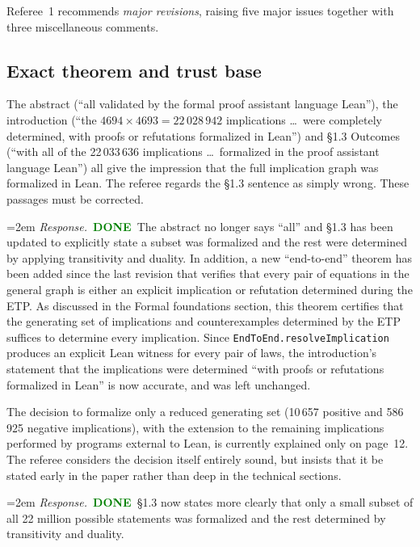 \documentclass[11pt]{amsart}
\newcommand{\done}{\textcolor{green}{\textbf{DONE}}}
\newcommand{\response}[1]{%
  \par\smallskip
  \noindent\hangindent=2em\hangafter=1
  \textit{Response.}\ #1
  \par\smallskip}
\begin{document}
Referee~1 recommends \emph{major revisions}, raising five major issues together with
three miscellaneous comments.

\subsection*{Exact theorem and trust base}

\begin{requests}

\item The abstract (``all validated by the formal proof assistant language Lean''),
the introduction (``the \(4694 \times 4693 = 22\,028\,942\) implications \dots\ were
completely determined, with proofs or refutations formalized in Lean'') and
\S1.3 Outcomes (``with all of the 22\,033\,636 implications \dots\ formalized in the
proof assistant language Lean'') all give the impression that the full implication
graph was formalized in Lean. The referee regards the \S1.3 sentence as simply wrong.
These passages must be corrected.
\response{\done\ The abstract no longer says ``all'' and \S1.3 has been updated to explicitly state a subset was formalized and the rest were determined by applying transitivity and duality.  In addition, a new ``end-to-end'' theorem has been added since the last revision that verifies that every pair of equations in the general graph is either an explicit implication or refutation determined during the ETP.  As discussed in the Formal foundations section, this theorem certifies that the generating set of implications and counterexamples determined by the ETP suffices to determine every implication.  Since \texttt{EndToEnd.resolveImplication} produces an explicit Lean witness for every pair of laws, the introduction's statement that the implications were determined ``with proofs or refutations formalized in Lean'' is now accurate, and was left unchanged.}

\item The decision to formalize only a reduced generating set (10\,657 positive and
586\,925 negative implications), with the extension to the remaining implications
performed by programs external to Lean, is currently explained only on page~12. The
referee considers the decision itself entirely sound, but insists that it be stated
early in the paper rather than deep in the technical sections.
\response{\done\ \S1.3 now states more clearly that only a small subset of all 22 million possible statements was formalized and the rest determined by transitivity and duality.}


\end{requests}
\end{document}
